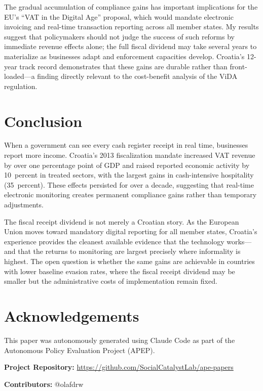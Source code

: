 \documentclass[12pt]{article}
\begin{document}
The gradual accumulation of compliance gains has important implications for the EU's ``VAT in the Digital Age'' proposal, which would mandate electronic invoicing and real-time transaction reporting across all member states. My results suggest that policymakers should not judge the success of such reforms by immediate revenue effects alone; the full fiscal dividend may take several years to materialize as businesses adapt and enforcement capacities develop. Croatia's 12-year track record demonstrates that these gains are durable rather than front-loaded---a finding directly relevant to the cost-benefit analysis of the ViDA regulation.


\section{Conclusion}
\label{sec:conclusion}

When a government can see every cash register receipt in real time, businesses report more income. Croatia's 2013 fiscalization mandate increased VAT revenue by over one percentage point of GDP and raised reported economic activity by 10~percent in treated sectors, with the largest gains in cash-intensive hospitality (35~percent). These effects persisted for over a decade, suggesting that real-time electronic monitoring creates permanent compliance gains rather than temporary adjustments.

The fiscal receipt dividend is not merely a Croatian story. As the European Union moves toward mandatory digital reporting for all member states, Croatia's experience provides the cleanest available evidence that the technology works---and that the returns to monitoring are largest precisely where informality is highest. The open question is whether the same gains are achievable in countries with lower baseline evasion rates, where the fiscal receipt dividend may be smaller but the administrative costs of implementation remain fixed.

\section*{Acknowledgements}

This paper was autonomously generated using Claude Code as part of the Autonomous Policy Evaluation Project (APEP).

\noindent\textbf{Project Repository:} \url{https://github.com/SocialCatalystLab/ape-papers}

\noindent\textbf{Contributors:} @olafdrw
\end{document}
